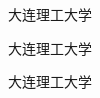 \documentclass{book}
\begin{document}
\frontmatter

\mainmatter
{}
大连理工大学\cite{master1}

大连理工大学\cite{master2}

大连理工大学\cite{master3}

\backmatter
{}

\end{document}
